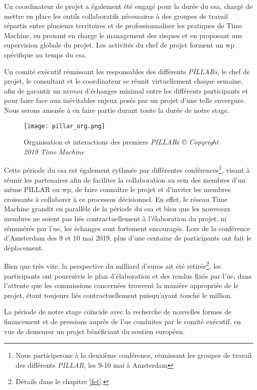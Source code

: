Un coordinateur de projet a également été engagé pour la durée du \gls{csa}, chargé de mettre en place les outils collaboratifs nécessaires à des groupes de travail répartis entre plusieurs territoires et de professionnaliser les pratiques de Time Machine, en prenant en charge le management des risques et en proposant une supervision globale du projet. Les activités du chef de projet forment un \gls{wp} spécifique au temps du \gls{csa}.

Un comité exécutif réunissant les responsables des différents \textit{PILLARs}, le chef de projet, le consultant et le coordinateur se réunit virtuellement chaque semaine, afin de garantir un niveau d'échanges minimal entre les différents participants et pour faire face aux inévitables enjeux posés par un projet d'une telle envergure. Nous serons amenée à en faire partie durant toute la durée de notre stage.

\begin{figure}[H]%
\centering
\texttt{[image: pillar\_org.png]}
\caption{Organisation et interactions des premiers \textit{PILLAR}s \textit{© Copyright 2019 Time Machine}}
\end{figure}

Cette période du \gls{csa} est également rythmée par différentes conférences\footnote{Nous participerons à la deuxième conférence, réunissant les groupes de travail des différents \textit{PILLAR}, les 9-10 mai à Amsterdam}, visant à réunir les partenaires afin de faciliter la collaboration au sein des membres d'un même PILLAR ou \gls{wp}, de faire connaître le projet et d'inviter les membres croissants à collaborer à ce processus décisionnel. En effet, le réseau Time Machine grandit en parallèle de la période du \gls{csa} et bien que les nouveaux membres ne soient pas liés contractuellement à l'élaboration du projet, ni rémunérés par l'\gls{ue}, les échanges sont fortement encouragés. Lors de la conférence d'Amsterdam des 9 et 10 mai 2019, plus d'une centaine de participants ont fait le déplacement.

Bien que très vite, la perspective du milliard d'euros ait été retirée\footnote{Détails dans le chapitre \ref{fet}.}, les participants ont poursuivis le plan d'élaboration et des rendus fixés par l'\gls{ue}, dans l'attente que les commissions concernées trouvent la manière appropriée de  le projet, étant toujours liés contractuellement puisqu'ayant touché le million. 

La période de notre stage coïncide avec la recherche de nouvelles formes de financement et de pressions auprès de l'\gls{ue} conduites par le comité exécutif, en vue de demeurer un projet bénéficiant du soutien européen.

